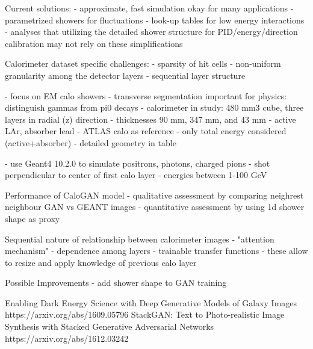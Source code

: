 Current solutions: - approximate, fast simulation okay for many applications -
parametrized showers for fluctuations - look-up tables for low energy
interactions - analyses that utilizing the detailed shower structure for
PID/energy/direction calibration may not rely on these simplifications

Calorimeter dataset specific challenges: - sparsity of hit cells - non-uniform
granularity among the detector layers - sequential layer structure

- focus on EM calo showers - transverse segmentation important for physics:
distinguish gammas from pi0 decays - calorimeter in study: 480 mm3 cube, three
layers in radial (z) direction - thicknesses 90 mm, 347 mm, and 43 mm - active
LAr, absorber lead - ATLAS calo as reference - only total energy considered
(active+absorber) - detailed geometry in table

- use Geant4 10.2.0 to simulate positrons, photons, charged pions - shot
perpendicular to center of first calo layer - energies between 1-100 GeV

Performance of CaloGAN model - qualitative assessment by comparing neighrest
neighbour GAN vs GEANT images - quantitative assessment by using 1d shower shape
as proxy

Sequential nature of relationship between calorimeter images - "attention
mechanism" - dependence among layers - trainable transfer functions - these
allow to resize and apply knowledge of previous calo layer

Possible Improvements - add shower shape to GAN training


Enabling Dark Energy Science with Deep Generative Models of Galaxy Images
https://arxiv.org/abs/1609.05796 StackGAN: Text to Photo-realistic Image
Synthesis with Stacked Generative Adversarial Networks
https://arxiv.org/abs/1612.03242